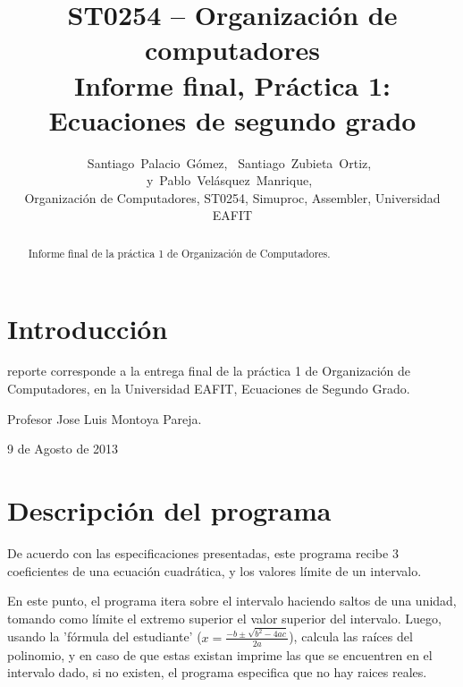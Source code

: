 \documentclass[12pt,journal,compsoc]{IEEEtran}
\begin{document}
\title{
ST0254 – Organizaci\'on de computadores\\
Informe final, Pr\'actica 1: Ecuaciones de segundo grado}
\author{Santiago~Palacio~G\'omez,~
        Santiago~Zubieta~Ortiz,~
        y~Pablo~Vel\'asquez~Manrique,~
        
\begin{abstract}
Informe final de la pr\'actica 1 de Organizaci\'on de Computadores.
\end{abstract}
\begin{IEEEkeywords}
Organizaci\'on de Computadores, ST0254, Simuproc, Assembler, Universidad EAFIT
\end{IEEEkeywords}}


\maketitle


\IEEEdisplaynotcompsoctitleabstractindextext
\IEEEpeerreviewmaketitle



\section{Introducci\'on}
 reporte corresponde a la entrega final de la pr\'actica 1
de Organizaci\'on de Computadores, en la Universidad EAFIT, 
Ecuaciones de Segundo Grado.

Profesor Jose Luis Montoya Pareja.

 
\hfill 9 de Agosto de 2013

\section{Descripci\'on del programa}

De acuerdo con las especificaciones presentadas, este programa recibe 3 coeficientes de una ecuaci\'on cuadr\'atica, y los valores l\'imite de un intervalo.

En este punto, el programa itera sobre el intervalo haciendo saltos de una unidad, tomando como l\'imite el extremo superior el valor superior del intervalo. Luego, usando la 'f\'ormula del estudiante' ($x = \frac{-b \pm \sqrt{b^2-4ac}}{2a}$), calcula las ra\'ices del polinomio, y en caso de que estas existan imprime las que se encuentren en el intervalo dado, si no existen, el programa especifica que no hay raices reales.
\end{document}

